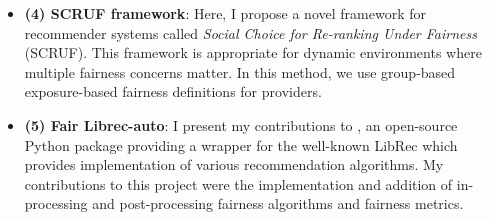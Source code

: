 \begin{itemize}
    
    \item \textbf{(4) SCRUF framework}:
    Here, I propose a novel framework for recommender systems called \textit{Social Choice for Re-ranking Under Fairness} (SCRUF). This framework is appropriate for dynamic environments where multiple fairness concerns matter. In this method, we use group-based exposure-based fairness definitions for providers.
    
    \item \textbf{(5) Fair Librec-auto}: I present my contributions to \libauto{}, an open-source Python package providing a wrapper for the well-known LibRec which provides implementation of various recommendation algorithms. My contributions to this project were the implementation and addition of in-processing and post-processing fairness algorithms and fairness metrics.
    
\end{itemize}